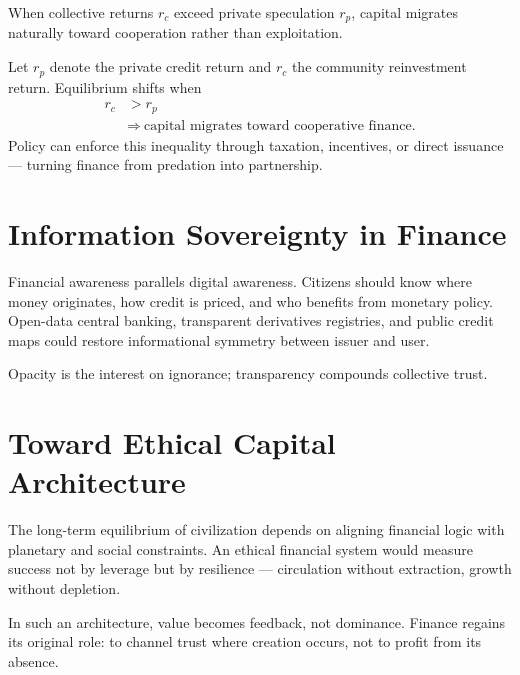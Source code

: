 \documentclass[12pt,twoside]{book}
\begin{document}
When collective returns $r_c$ exceed private speculation $r_p$, capital migrates naturally toward
cooperation rather than exploitation.

\begin{tcolorbox}[colback=gray!5,
  colframe=gray!60,
  boxrule=0.4pt,
  arc=1mm,
  title={Mathematical Interlude: Cooperative Credit Equilibrium},
  enhanced,
  breakable,
  left=5pt,
  right=5pt]
\small
Let $r_p$ denote the private credit return and $r_c$ the community reinvestment return.
Equilibrium shifts when
\[
\begin{aligned}
r_c &> r_p \\
&\Rightarrow\ \text{capital migrates toward cooperative finance.}
\end{aligned}
\]
Policy can enforce this inequality through taxation, incentives, or direct issuance —
turning finance from predation into partnership.
\end{tcolorbox}

\section{Information Sovereignty in Finance}

Financial awareness parallels digital awareness.
Citizens should know where money originates, how credit is priced, and who benefits from
monetary policy.
Open-data central banking, transparent derivatives registries, and public credit maps could
restore informational symmetry between issuer and user.\\

\begin{keyidea}
Opacity is the interest on ignorance; transparency compounds collective trust.
\end{keyidea}

\section{Toward Ethical Capital Architecture}

The long-term equilibrium of civilization depends on aligning financial logic with planetary and
social constraints.
An ethical financial system would measure success not by leverage but by resilience —
circulation without extraction, growth without depletion.

In such an architecture, value becomes feedback, not dominance.
Finance regains its original role: to channel trust where creation occurs, not to profit from its absence.\\
\end{document}

